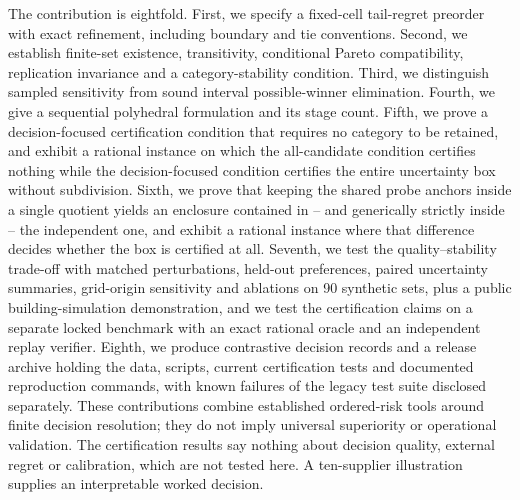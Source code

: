 The contribution is eightfold. First, we specify a fixed-cell tail-regret preorder with exact refinement, including boundary and tie conventions. Second, we establish finite-set existence, transitivity, conditional Pareto compatibility, replication invariance and a category-stability condition. Third, we distinguish sampled sensitivity from sound interval possible-winner elimination. Fourth, we give a sequential polyhedral formulation and its stage count. Fifth, we prove a decision-focused certification condition that requires no category to be retained, and exhibit a rational instance on which the all-candidate condition certifies nothing while the decision-focused condition certifies the entire uncertainty box without subdivision. Sixth, we prove that keeping the shared probe anchors inside a single quotient yields an enclosure contained in -- and generically strictly inside -- the independent one, and exhibit a rational instance where that difference decides whether the box is certified at all. Seventh, we test the quality--stability trade-off with matched perturbations, held-out preferences, paired uncertainty summaries, grid-origin sensitivity and ablations on 90 synthetic sets, plus a public building-simulation demonstration, and we test the certification claims on a separate locked benchmark with an exact rational oracle and an independent replay verifier. Eighth, we produce contrastive decision records and a release archive holding the data, scripts, current certification tests and documented reproduction commands, with known failures of the legacy test suite disclosed separately. These contributions combine established ordered-risk tools around finite decision resolution; they do not imply universal superiority or operational validation. The certification results say nothing about decision quality, external regret or calibration, which are not tested here. A ten-supplier illustration supplies an interpretable worked decision.
